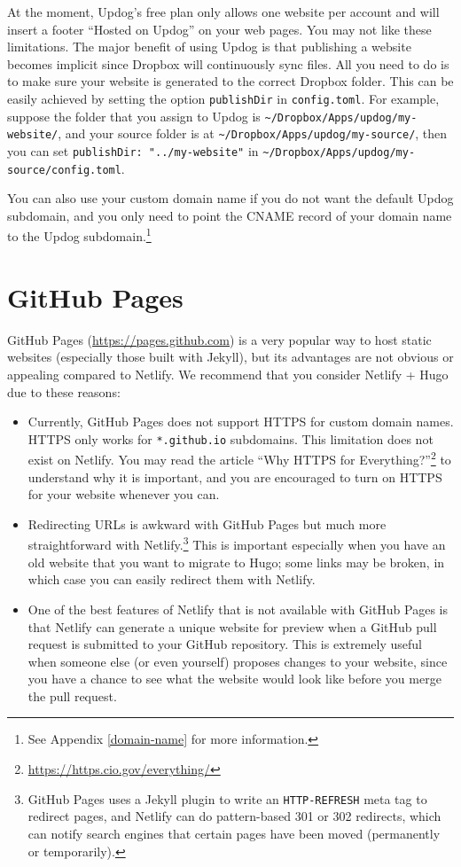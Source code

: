\documentclass[12pt,]{krantz}
\renewcommand{\href}[2]{#2\footnote{\url{#1}}}
\theoremstyle{definition}
\theoremstyle{definition}
\theoremstyle{definition}
\theoremstyle{remark}
\begin{document}
At the moment, Updog's free plan only allows one website per account and
will insert a footer ``Hosted on Updog'' on your web pages. You may not
like these limitations. The major benefit of using Updog is that
publishing a website becomes implicit since Dropbox will continuously
sync files. All you need to do is to make sure your website is generated
to the correct Dropbox folder. This can be easily achieved by setting
the option \texttt{publishDir} in \texttt{config.toml}. For example,
suppose the folder that you assign to Updog is
\texttt{\textasciitilde{}/Dropbox/Apps/updog/my-website/}, and your
source folder is at
\texttt{\textasciitilde{}/Dropbox/Apps/updog/my-source/}, then you can
set \texttt{publishDir:\ "../my-website"} in
\texttt{\textasciitilde{}/Dropbox/Apps/updog/my-source/config.toml}.

You can also use your custom domain name if you do not want the default
Updog subdomain, and you only need to point the CNAME record of your
domain name to the Updog subdomain.\footnote{See Appendix
  \ref{domain-name} for more information.}

\hypertarget{github-pages}{%
\section{GitHub Pages}\label{github-pages}}

GitHub Pages (\url{https://pages.github.com})  is a
very popular way to host static websites (especially those built with
Jekyll), but its advantages are not obvious or appealing compared to
Netlify. We recommend that you consider Netlify + Hugo due to these
reasons:

\begin{itemize}
\item
  Currently, GitHub Pages does not support HTTPS for custom domain
  names. HTTPS only works for \texttt{*.github.io} subdomains. This
  limitation does not exist on Netlify. You may read the article
  \href{https://https.cio.gov/everything/}{``Why HTTPS for
  Everything?''} to understand why it is important, and you are
  encouraged to turn on HTTPS for your website whenever you can.
\item
  Redirecting URLs is awkward with GitHub Pages but much more
  straightforward with Netlify.\footnote{GitHub Pages uses a Jekyll
    plugin to write an \texttt{HTTP-REFRESH} meta tag to redirect pages,
    and Netlify can do pattern-based 301 or 302 redirects, which can
    notify search engines that certain pages have been moved
    (permanently or temporarily).} This is important especially when you
  have an old website that you want to migrate to Hugo; some links may
  be broken, in which case you can easily redirect them with Netlify.
\item
  One of the best features of Netlify that is not available with GitHub
  Pages is that Netlify can generate a unique website for preview when a
  GitHub pull request is submitted to your GitHub repository. This is
  extremely useful when someone else (or even yourself) proposes changes
  to your website, since you have a chance to see what the website would
  look like before you merge the pull request.
\end{itemize}
\end{document}
